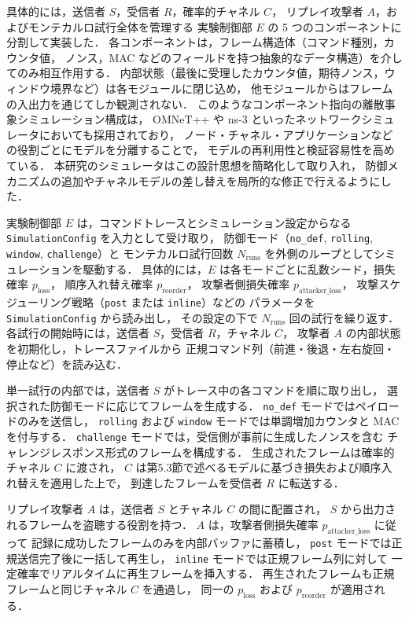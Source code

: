\documentclass[twocolumn,10pt,a4paper]{jsarticle}
\begin{document}
具体的には，送信者 $S$，受信者 $R$，確率的チャネル $C$，
リプレイ攻撃者 $A$，およびモンテカルロ試行全体を管理する
実験制御部 $E$ の 5 つのコンポーネントに分割して実装した．
各コンポーネントは，フレーム構造体（コマンド種別，カウンタ値，
ノンス，MAC などのフィールドを持つ抽象的なデータ構造）を介してのみ相互作用する．
内部状態（最後に受理したカウンタ値，期待ノンス，ウィンドウ境界など）は各モジュールに閉じ込め，
他モジュールからはフレームの入出力を通じてしか観測されない．
このようなコンポーネント指向の離散事象シミュレーション構成は，
OMNeT++ や ns-3 といったネットワークシミュレータにおいても採用されており\cite{OMNeTppIntro,ns3Tutorial}，
ノード・チャネル・アプリケーションなどの役割ごとにモデルを分離することで，
モデルの再利用性と検証容易性を高めている．
本研究のシミュレータはこの設計思想を簡略化して取り入れ，
防御メカニズムの追加やチャネルモデルの差し替えを局所的な修正で行えるようにした．

実験制御部 $E$ は，コマンドトレースとシミュレーション設定からなる
\texttt{SimulationConfig} を入力として受け取り，
防御モード（\texttt{no\_def}, \texttt{rolling}, \texttt{window}, \texttt{challenge}）と
モンテカルロ試行回数 $N_{\mathrm{runs}}$ を外側のループとしてシミュレーションを駆動する．
具体的には，$E$ は各モードごとに乱数シード，損失確率 $p_{\mathrm{loss}}$，
順序入れ替え確率 $p_{\mathrm{reorder}}$，
攻撃者側損失確率 $p_{\mathrm{attacker\_loss}}$，
攻撃スケジューリング戦略（\texttt{post} または \texttt{inline}）などの
パラメータを \texttt{SimulationConfig} から読み出し，
その設定の下で $N_{\mathrm{runs}}$ 回の試行を繰り返す．
各試行の開始時には，送信者 $S$，受信者 $R$，チャネル $C$，
攻撃者 $A$ の内部状態を初期化し，トレースファイルから
正規コマンド列（前進・後退・左右旋回・停止など）を読み込む．

単一試行の内部では，送信者 $S$ がトレース中の各コマンドを順に取り出し，
選択された防御モードに応じてフレームを生成する．
\texttt{no\_def} モードではペイロードのみを送信し，
\texttt{rolling} および \texttt{window} モードでは単調増加カウンタと MAC を付与する．
\texttt{challenge} モードでは，受信側が事前に生成したノンスを含む
チャレンジレスポンス形式のフレームを構成する．
生成されたフレームは確率的チャネル $C$ に渡され，
$C$ は第5.3節で述べるモデルに基づき損失および順序入れ替えを適用した上で，
到達したフレームを受信者 $R$ に転送する．

リプレイ攻撃者 $A$ は，送信者 $S$ とチャネル $C$ の間に配置され，
$S$ から出力されるフレームを盗聴する役割を持つ．
$A$ は，攻撃者側損失確率 $p_{\mathrm{attacker\_loss}}$ に従って
記録に成功したフレームのみを内部バッファに蓄積し，
\texttt{post} モードでは正規送信完了後に一括して再生し，
\texttt{inline} モードでは正規フレーム列に対して
一定確率でリアルタイムに再生フレームを挿入する．
再生されたフレームも正規フレームと同じチャネル $C$ を通過し，
同一の $p_{\mathrm{loss}}$ および $p_{\mathrm{reorder}}$ が適用される．
\end{document}
